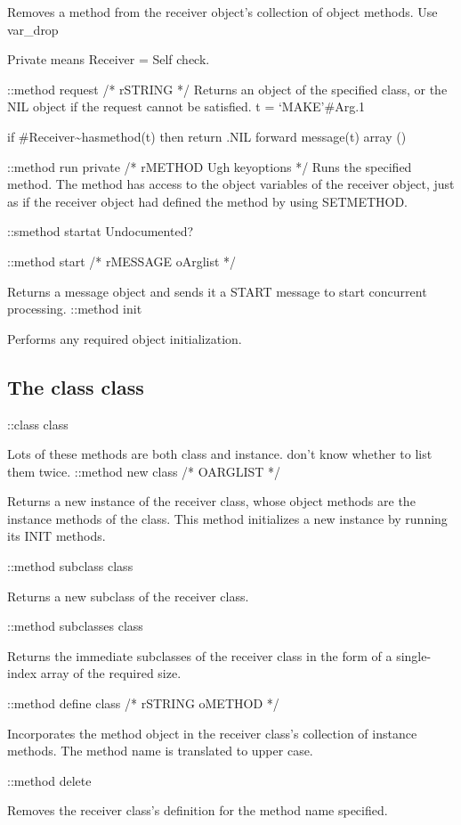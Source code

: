 Removes a method from the receiver object's collection of object
methods. Use var\_drop

Private means Receiver = Self check.

::method request /* rSTRING */ Returns an object of the specified class,
or the NIL object if the request cannot be satisfied. t = `MAKE'\#Arg.1

if \#Receiver\textasciitilde hasmethod(t) then return .NIL forward
message(t) array ()

::method run private /* rMETHOD Ugh keyoptions */ Runs the specified
method. The method has access to the object variables of the receiver
object, just as if the receiver object had defined the method by using
SETMETHOD.

::smethod startat Undocumented?

::method start /* rMESSAGE oArglist */

Returns a message object and sends it a START message to start
concurrent processing. ::method init

Performs any required object initialization.

\hypertarget{the-class-class}{%
\subsection{The class class}\label{the-class-class}}

::class class

Lots of these methods are both class and instance. \textbar{} don't know
whether to list them twice. ::method new class /* OARGLIST */

Returns a new instance of the receiver class, whose object methods are
the instance methods of the class. This method initializes a new
instance by running its INIT methods.

::method subclass class

Returns a new subclass of the receiver class.

::method subclasses class

Returns the immediate subclasses of the receiver class in the form of a
single-index array of the required size.

::method define class /* rSTRING oMETHOD */

Incorporates the method object in the receiver class's collection of
instance methods. The method name is translated to upper case.

::method delete

Removes the receiver class's definition for the method name specified.

